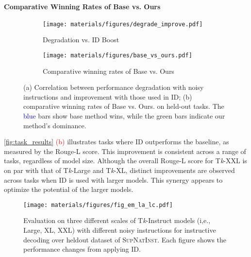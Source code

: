 \vspace{-5pt}
\paragraph{Comparative Winning Rates of Base vs. Ours} 

\begin{figure}[b]
\vspace{-10pt}
    \begin{subfigure}{0.315\textwidth}
        \centering
        \texttt{[image: materials/figures/degrade\_improve.pdf]}
        \vspace{-5pt}
        \caption{Degradation vs. ID Boost}
    \end{subfigure}
    \hfill
    \begin{subfigure}{0.657\textwidth}
        \centering
        \texttt{[image: materials/figures/base\_vs\_ours.pdf]}
        \vspace{-15pt}
        \caption{Comparative winning rates of Base vs. Ours}
    \end{subfigure}
    \vspace{-5pt}
    \caption{(a) Correlation between performance degradation with noisy instructions and improvement with those used in ID; (b) comparative winning rates of Base vs. Ours. on held-out tasks. The \textcolor{blue}{blue} bars show base method wins, while the \textcolor{green!60!black}{green} bars indicate our method's dominance.}
    \label{fig:task_results}
    \vspace{-15pt}
\end{figure}

\autoref{fig:task_results} \textcolor{red}{(b)} illustrates tasks where ID outperforms the baseline, as measured by the Rouge-L score. This improvement is consistent across a range of tasks, regardless of model size. Although the overall Rouge-L score for T\textit{k}-XXL is on par with that of T\textit{k}-Large and T\textit{k}-XL, distinct improvements are observed across tasks when ID is used with larger models. This synergy appears to optimize the potential of the larger models.

\begin{figure}[h]
\centering
\texttt{[image: materials/figures/fig\_em\_la\_lc.pdf]}
\caption{Evaluation on three different scales of T\textit{k}-Instruct models (i,e., Large, XL, XXL) with different noisy instructions for instructive decoding over heldout dataset of \textsc{SupNatInst}. Each figure shows the performance changes from applying ID.}
\label{fig:em_ic_sc}
\end{figure}

